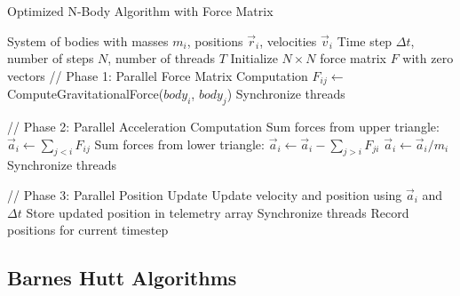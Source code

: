 \documentclass{article}
\begin{document}
\begin{algorithm}[H]
    \caption{Optimized N-Body Algorithm with Force Matrix}\label{alg:optimized_matrix}
    \begin{algorithmic}[0]
        \Require System of bodies with masses $m_i$, positions $\vec{r}_i$, velocities $\vec{v}_i$
        \Require Time step $\Delta t$, number of steps $N$, number of threads $T$
        \State Initialize $N \times N$ force matrix $F$ with zero vectors
            \State // Phase 1: Parallel Force Matrix Computation
                 
                        \State $F_{ij} \gets$ ComputeGravitationalForce($body_i$, $body_j$)
                    \EndFor
                \EndFor
            \EndFor
            \State Synchronize threads
            
            \State // Phase 2: Parallel Acceleration Computation
                    \State Sum forces from upper triangle: $\vec{a}_i \gets \sum_{j<i} F_{ij}$
                    \State Sum forces from lower triangle: $\vec{a}_i \gets \vec{a}_i - \sum_{j>i} F_{ji}$
                    \State $\vec{a}_i \gets \vec{a}_i/m_i$
                \EndFor
            \EndFor
            \State Synchronize threads
            
            \State // Phase 3: Parallel Position Update
                    \State Update velocity and position using $\vec{a}_i$ and $\Delta t$
                    \State Store updated position in telemetry array
                \EndFor
            \EndFor
            \State Synchronize threads
            \State Record positions for current timestep
        \EndFor
    \end{algorithmic}
\end{algorithm}

\subsection{Barnes Hutt Algorithms}
\end{document}
